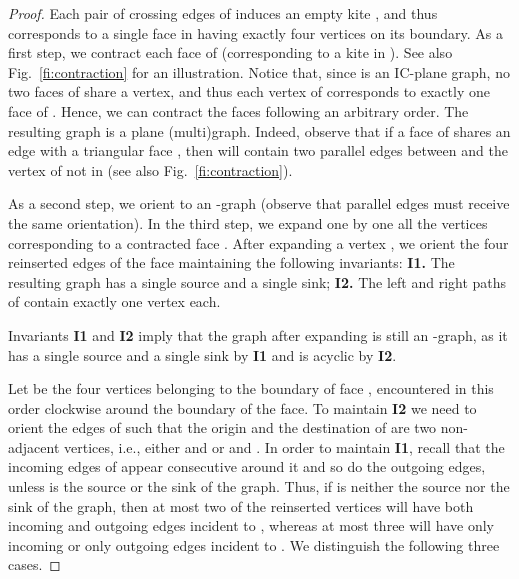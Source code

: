 \documentclass[a4paper]{article}
\begin{document}
\begin{proof}
Each pair of crossing edges of  induces an empty kite , and thus corresponds to a single face  in  having exactly four vertices on its boundary. As a first step, we contract each face  of  (corresponding to a kite  in ). See also Fig.~\ref{fi:contraction} for an illustration. Notice that, since  is an IC-plane graph, no two faces of  share a vertex, and thus each vertex  of  corresponds to exactly one face of . Hence, we can contract the faces following an arbitrary order. The resulting graph  is a plane (multi)graph. Indeed, observe that if a face  of  shares an edge with a triangular face , then  will contain two parallel edges between  and the vertex  of  not in  (see also Fig.~\ref{fi:contraction}). 

As a second step, we orient  to an -graph (observe that parallel edges must receive the same orientation). In the third step, we expand one by one all the vertices  corresponding to a contracted face . After expanding a vertex , we orient the four reinserted edges of the face   maintaining the following invariants: {\bf I1.} The resulting graph has a single source and a single sink; {\bf I2.} The left and right paths of  contain exactly one vertex each.


Invariants {\bf I1} and {\bf I2} imply that the graph after expanding  is still an -graph, as it has a single source and a single sink by {\bf I1} and is acyclic by {\bf I2}. 

Let  be the four vertices belonging to the boundary of face , encountered in this order clockwise around the boundary of the face. To maintain {\bf I2} we need to orient the edges of  such that the origin and the destination of  are two non-adjacent vertices, i.e., either  and  or  and . In order to maintain {\bf I1}, recall that the incoming edges of  appear consecutive around it and so do the outgoing edges, unless  is the source or the sink of the graph. Thus, if  is neither the source nor the sink of the graph, then at most two of the reinserted vertices will have both incoming and outgoing edges incident to , whereas at most three will have only incoming or only outgoing  edges incident to . We distinguish the following three cases.

\medskip


\end{proof}
\end{document}
